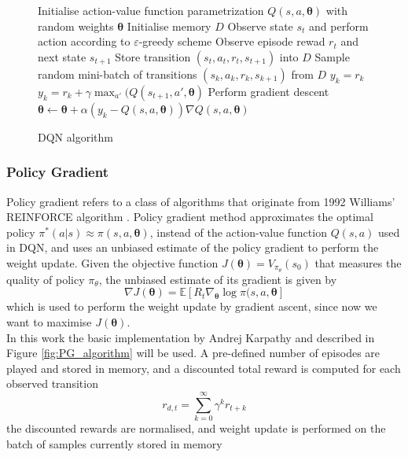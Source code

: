 \documentclass[a4paper, 11pt]{article}
\renewenvironment{algorithmic}[1][0]{%
  \hrulefill\par
  \oldalgorithmic[#1]}
  {\endoldalgorithmic\par
   \vspace*{-.5\baselineskip}
   \hrulefill\par
  }
\begin{document}
\begin{figure}[!htb]
  \begin{algorithmic}
    \State Initialise action-value function parametrization $Q(s,a,\boldsymbol{\theta})$ with random weights $\boldsymbol{\theta}$
    \State Initialise memory $D$
    		\Repeat
    			\State Observe state $s_t$ and perform action according to $\varepsilon$-greedy scheme
    			\State Observe episode rewad $r_t$ and next state $s_{t+1} $ 
    			\State Store transition $(s_t, a_t, r_t, s_{t+1})$ into $D$
    			\State Sample random mini-batch of transitions $(s_k , a_k, r_k, s_{k+1})$ from $D$
    				\State $y_k = r_k$
    			\Else
    				\State $y_k = r_k + \gamma \max_{a'}(Q(s_{t+1}, a', \boldsymbol{\theta})$
    			\EndIf
    			\State Perform gradient descent $\boldsymbol{\theta} \gets \boldsymbol{\theta} + \alpha(y_k - Q(s,a,\boldsymbol{\theta})) \nabla Q(s,a,\boldsymbol{\theta})$
    	\EndFor
  \end{algorithmic}
    \caption{DQN algorithm}\label{fig:DQN_algorithm}
\end{figure}

\subsubsection{Policy Gradient}
Policy gradient refers to a class of algorithms that originate from 1992 Williams' REINFORCE algorithm \cite{Williams1992}. Policy gradient method approximates the optimal policy $\pi^*(a|s) \approx \pi(s,a,\mathbf{\theta})$, instead of the action-value function $Q(s,a)$ used in DQN, and uses an unbiased estimate of the policy gradient to perform the weight update. Given the objective function $J(\mathbf{\theta}) = V_{\pi_{\theta}}(s_0)$ that measures the quality of policy $\pi_{\theta}$, the unbiased estimate of its gradient is given by \cite{Sutton}
\begin{equation}\label{eq:policy-gradient}
\nabla J(\mathbf{\theta})  =  \mathbb{E}\left[ R_t \nabla_\mathbf{\theta}\log \pi(s,a,\mathbf{\theta}\right]
\end{equation}  
which is used to perform the weight update by gradient ascent, since now we want to maximise $J(\mathbf{\theta})$.\\
In this work the basic implementation by Andrej Karpathy \cite{Karpathy} and described in Figure \ref{fig:PG_algorithm} will be used. A pre-defined number of episodes are played and stored in memory, and a discounted total reward is computed for each observed transition
\begin{equation}
r_{d,t} = \sum_{k=0}^{\infty} \gamma^k r_{t+k}
\end{equation}
the discounted rewards are normalised, and weight update is performed on the batch of samples currently stored in memory
\end{document}
